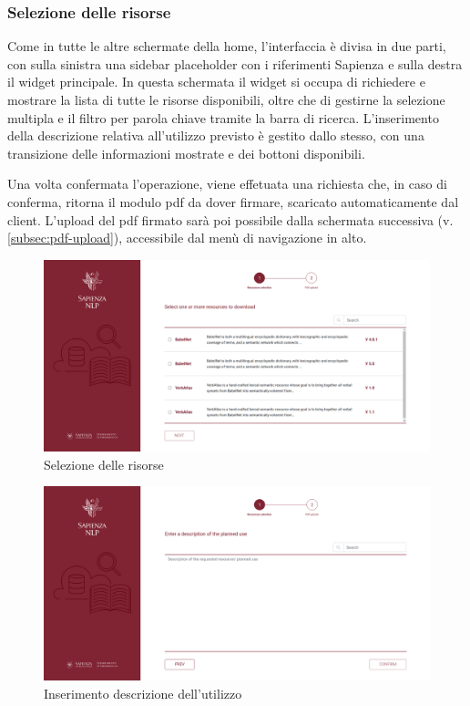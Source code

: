 \subsubsection{Selezione delle risorse} \label{subsec:resources-selection}
Come in tutte le altre schermate della home, l'interfaccia è divisa in due parti,
con sulla sinistra una sidebar placeholder con i riferimenti Sapienza e sulla
destra il widget principale. In questa schermata il widget si occupa di richiedere
e mostrare la lista di tutte le risorse disponibili, oltre che di gestirne la
selezione multipla e il filtro per parola chiave tramite la barra di ricerca.
L'inserimento della descrizione relativa all'utilizzo previsto è gestito dallo
stesso, con una transizione delle informazioni mostrate e dei bottoni disponibili.

Una volta confermata l'operazione, viene effetuata una richiesta che, in caso di
conferma, ritorna il modulo pdf da dover firmare, scaricato automaticamente dal
client. L'upload del pdf firmato sarà poi possibile dalla schermata successiva
(v. \autoref{subsec:pdf-upload}), accessibile dal menù di navigazione in alto.

\begin{figure}[H]
	\centering
	\includegraphics[width=\textwidth]{assets/ui/resources-selection.png}
	\caption{Selezione delle risorse}
	\label{fig:resources-selection}
\end{figure}

\begin{figure}[H]
	\centering
	\includegraphics[width=\textwidth]{assets/ui/request-description.png}
	\caption{Inserimento descrizione dell'utilizzo}
	\label{fig:request-description}
\end{figure}

